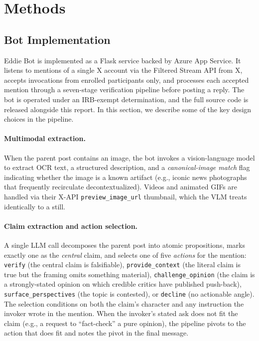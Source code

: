 \section{Methods}\label{sec:methods}
\subsection{Bot Implementation}\label{sec:bot-implementation}

Eddie Bot is implemented as a Flask service backed by Azure App Service. It listens to mentions of a single X account via the Filtered Stream API from X, accepts invocations from enrolled participants only, and processes each accepted mention through a seven-stage verification pipeline before posting a reply. The bot is operated under an IRB-exempt determination, and the full source code is released alongside this report. In this section, we describe some of the key design choices in the pipeline.

\paragraph{Multimodal extraction.} When the parent post contains an image, the bot invokes a vision-language model to extract OCR text, a structured description, and a \textit{canonical-image match} flag indicating whether the image is a known artifact (e.g., iconic news photographs that frequently recirculate decontextualized). Videos and animated GIFs are handled via their X-API \texttt{preview\_image\_url} thumbnail, which the VLM treats identically to a still.

\paragraph{Claim extraction and action selection.} A single LLM call decomposes the parent post into atomic propositions, marks exactly one as the \textit{central} claim, and selects one of five \textit{actions} for the mention: \texttt{verify} (the central claim is falsifiable), \texttt{provide\_context} (the literal claim is true but the framing omits something material), \texttt{challenge\_opinion} (the claim is a strongly-stated opinion on which credible critics have published push-back), \texttt{surface\_perspectives} (the topic is contested), or \texttt{decline} (no actionable angle). The selection conditions on both the claim's character and any instruction the invoker wrote in the mention. When the invoker's stated ask does not fit the claim (e.g., a request to ``fact-check'' a pure opinion), the pipeline pivots to the action that does fit and notes the pivot in the final message.

